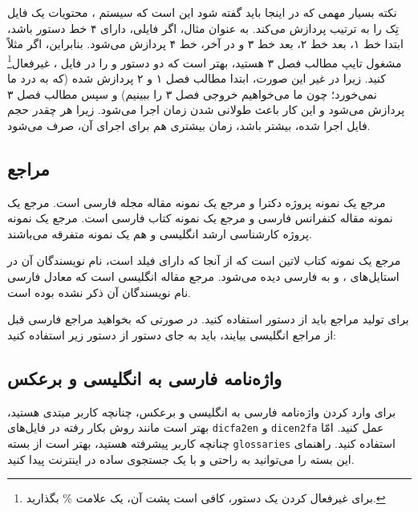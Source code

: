     نکته بسیار مهمی که در اینجا باید گفته شود این است که سیستم \lr{\TeX}، محتویات یک فایل تِک را به ترتیب پردازش می‌کند. به عنوان مثال، 
    اگر فایلی، دارای ۴ خط دستور باشد، ابتدا خط ۱، بعد خط ۲، بعد خط ۳ و در آخر، خط ۴ پردازش می‌شود. بنابراین، اگر مثلاً مشغول تایپ 
    مطالب فصل ۳ هستید، بهتر است     که دو دستور 
    \Verb!!     و     \Verb!!     را در فایل     ،
    غیرفعال\footnote{    برای غیرفعال کردن یک دستور، کافی است پشت آن، یک علامت    \%     بگذارید.    }
     کنید. زیرا در غیر این صورت، ابتدا مطالب فصل ۱ و ۲ پردازش شده (که به درد ما نمی‌خورد؛ چون ما می‌خواهیم خروجی فصل ۳ را ببینیم) 
     و سپس مطالب فصل ۳ پردازش می‌شود و این کار باعث طولانی شدن زمان اجرا می‌شود. زیرا هر چقدر حجم فایل اجرا شده، بیشتر باشد، 
     زمان بیشتری هم برای اجرای آن، صرف می‌شود.
     
    \subsection{مراجع}
    مرجع \cite{Omidali82phdThesis} یک نمونه پروژه دکترا و مرجع \cite{Vahedi87} یک نمونه مقاله مجله فارسی است.
    مرجع \cite{Amintoosi87afzayesh}  یک نمونه  مقاله کنفرانس فارسی و
    مرجع \cite{vahid90} یک نمونه کتاب فارسی است. مرجع \cite{Khalighi07MscThesis} یک نمونه پروژه کارشناسی ارشد انگلیسی و
    \cite{Khalighi87xepersian} هم یک نمونه متفرقه  می‌باشند.

    مرجع \cite{Gonzalez02book} یک نمونه کتاب لاتین است که از آنجا که دارای فیلد  است، 
    نام نویسندگان آن در استایل‌های ،  و  به فارسی دیده می‌شود\cite{Amintoosi1394persianbib}. 
    مرجع \cite{Baker02limits} مقاله انگلیسی است که معادل فارسی نام نویسندگان آن ذکر نشده بوده است.

    برای تولید مراجع باید از دستور  استفاده کنید. در صورتی که بخواهید مراجع فارسی قبل از
    مراجع انگلیسی بیایند، باید به جای دستور  از دستور زیر استفاده کنید:

    \begin{latin}
    \end{latin}
    
    
    \subsection{واژه‌نامه فارسی به انگلیسی و برعکس}
    برای وارد کردن واژه‌نامه فارسی به انگلیسی و برعکس، چنانچه کاربر مبتدی هستید، بهتر است مانند روش بکار رفته در فایل‌های 
    \Verb!dicfa2en!
    و
    \Verb!dicen2fa!
    عمل کنید. امّا چنانچه کاربر پیشرفته هستید، بهتر است از بسته
    \Verb!glossaries!
    استفاده کنید. راهنمای این بسته را می‌توانید به راحتی و با یک جستجوی ساده در اینترنت پیدا کنید.
